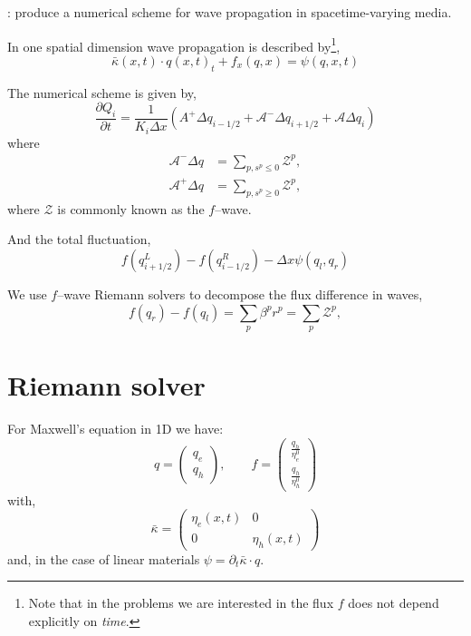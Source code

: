 \documentclass[]{article}
\renewcommand{\vec}{}
\newcommand{\q}{\vec{q}}
\newcommand{\qimh}{q_{i-1/2}}
\newcommand{\qiph}{q_{i+1/2}}
\newcommand{\barkappa}{\bar{\kappa}}
\newcommand{\A}{\mathcal{A}}
\newcommand{\Z}{\mathcal{Z}}
\begin{document}
: produce a numerical scheme for wave propagation in spacetime-varying media.
\newline

In one spatial dimension wave propagation is described by\footnote{\noindent Note that in the problems we are interested in the flux $f$ does not depend explicitly on \emph{time}.},
\begin{equation}
	\barkappa(x,t)\cdot\q(x,t)_t + \vec{f}_x(\q,x) = \vec{\psi}(\q,x,t) 
\end{equation}

The numerical scheme is given by,
\begin{equation}
	\frac{\partial Q_i}{\partial t} = \frac{1}{K_i \Delta x}\left(  A^{+}\Delta\qimh + \A^{-}\Delta\qiph + \A\Delta\q_i \right)
\end{equation}
where
\begin{subequations}
	\begin{alignat}{1}
		\A^{-}\Delta q  &= \sum_{p,s^p\leq 0} \Z^p,\\
		\A^{+}\Delta q &= \sum_{p,s^p\geq 0} \Z^p,
	\end{alignat}
\end{subequations}
where $\Z$ is commonly known as the $f$--wave.

And the total fluctuation,
\begin{equation}
	f(\qiph^L) - f(\qimh^R) - \Delta x \psi(q_l,q_r)	
\end{equation}

We use $f$--wave Riemann solvers to decompose the flux difference in waves,
\begin{equation}
	f(q_r) -f(q_l) = \sum_p \beta^p r^p = \sum_p \Z^p,
\end{equation}

\section{Riemann solver}
For Maxwell's equation in 1D we have:
\begin{equation}
	\q = \left(\begin{array}{c} q_e \\ q_h \end{array}\right), \qquad \vec{f} = \left(\begin{array}{c} \frac{q_h}{\eta_e^0} \\ \frac{q_h}{\eta_h^0} \end{array}\right)
\end{equation}
with,
\begin{equation}
	\barkappa = \left({\begin{array}{cc} \eta_e(x,t) & 0 \\ 0 & \eta_h(x,t) \end{array}}\right)
\end{equation}
and, in the case of linear materials $\vec{\psi}=\partial_t\barkappa\cdot\q$.
\end{document}
